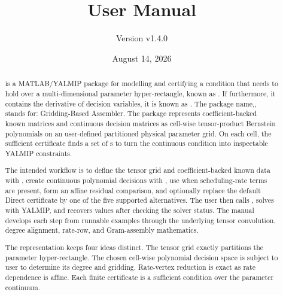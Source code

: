 \documentclass[11pt]{report}
\title{\pkg\\User Manual} \author{Version v1.4.0} \date{August 14, 2026}
\begin{document}
\hypersetup{pageanchor=false}

\maketitle

\begin{abstract}
\pkg{} is a MATLAB/YALMIP package for modelling and certifying a  condition that needs to hold over a multi-dimensional parameter hyper-rectangle, known as . If furthermore, it contains the derivative of decision variables, it is known as . The package name,\pkg{}, stands for: Gridding-Based  Assembler. The package represents coefficient-backed known matrices and continuous decision matrices as cell-wise tensor-product Bernstein polynomials on an user-defined partitioned physical parameter grid. On each cell, the sufficient certificate finds a set of s to turn the continuous condition into inspectable YALMIP constraints.

The intended workflow is to define the tensor grid and coefficient-backed known data with , create continuous polynomial decisions with , use  when scheduling-rate terms are present, form an affine residual comparison, and optionally replace the default Direct certificate by one of the five supported alternatives. The user then calls , solves with YALMIP, and recovers values after checking the solver status. The manual develops each step from runnable examples through the underlying tensor convolution, degree alignment, rate-row, and Gram-assembly mathematics.

The representation keeps four ideas distinct. The tensor grid exactly partitions the parameter hyper-rectangle. The chosen cell-wise polynomial decision space is subject to user to determine its degree and gridding. Rate-vertex reduction is exact as rate dependence is affine. Each finite certificate is a sufficient condition over the parameter continuum.
\end{abstract}

\clearpage
{}
\hypersetup{pageanchor=true}
\tableofcontents



\clearpage
{}








\end{document}
